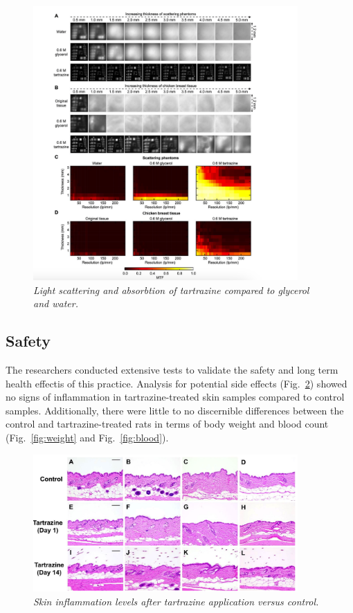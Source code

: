\documentclass[12pt]{article}
\begin{document}
\begin{figure}[H]
  \centering
  \includegraphics[width=0.9\textwidth]{figures/tartrazine vs gl.png}
  \caption{\emph{Light scattering and absorbtion of tartrazine compared to glycerol and water.}}
  \label{fig:comparison}
\end{figure}



\subsection{Safety}
The researchers conducted extensive tests to validate the safety and long term health effectis of this practice. 
Analysis for potential side effects (Fig.~\ref{fig:health}) showed no signs of inflammation in tartrazine-treated skin samples compared to control samples. 
Additionally, there were little to no discernible differences between the control and tartrazine-treated rats in terms of body weight and blood count (Fig.~\ref{fig:weight} and Fig.~\ref{fig:blood}).


\begin{figure}[H]
  \centering
  \includegraphics[width=0.9\textwidth]{figures/health.png}
  \caption{\emph{Skin inflammation levels after tartrazine application versus control.}}
  \label{fig:health}
\end{figure}
\end{document}
